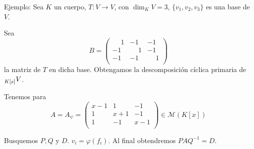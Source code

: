 Ejemplo: Sea \(K\) un cuerpo, \(T:V\longrightarrow V\), con
\(\dim_K V=3\), \(\{v_1,v_2,v_3\}\) es una base de \(V\).

Sea
\[
  B=
  \begin{pmatrix}
    \phantom{-}1  & -1  & -1  \\
    -1  & \phantom{-}1  & -1  \\
    -1  & -1 &  \phantom{-}1  \\
  \end{pmatrix}
\]
la matriz de \(T\) en dicha base. Obtengamos la descomposición cíclica
primaria de \(\prescript{}{K[x]}{V}\).

Tenemos para
\[
  A=A_\psi=
  \begin{pmatrix}
    x{-}1  & 1  & -1  \\
    1  & x{+}1  & -1  \\
    1  & -1 &  x{-}1  \\
  \end{pmatrix}\in\mathcal{M}(K[x])
\]

Busquemos \(P, Q\) y \(D\).
\(v_i=\varphi(f_i)\). Al final obtendremos \(PAQ^{-1}=D\).

